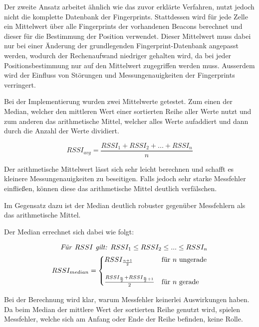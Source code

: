 Der zweite Ansatz arbeitet ähnlich wie das zuvor erklärte Verfahren, nutzt jedoch nicht die komplette Datenbank der Fingerprints. 
Stattdessen wird für jede Zelle ein Mittelwert über alle Fingerprints der vorhandenen Beacons berechnet und dieser für die Bestimmung der Position verwendet.
Dieser Mittelwert muss dabei nur bei einer Änderung der grundlegenden Fingerprint-Datenbank angepasst werden, wodurch der Rechenaufwand niedriger gehalten wird, da bei jeder Positionsbestimmung nur auf den Mittelwert zugegriffen werden muss.
Ausserdem wird der Einfluss von Störungen und Messungenauigkeiten der Fingerprints verringert.

Bei der Implementierung wurden zwei Mittelwerte getestet. Zum einen der Median, welcher den mittleren Wert einer sortierten Reihe aller Werte nutzt und zum anderen das arithmetische Mittel, welcher alles Werte aufaddiert und dann durch die Anzahl der Werte dividiert.

\begin{equation}
	RSSI_{avg} = \frac{RSSI_{1} + RSSI_{2} + ... + RSSI_{n}}{n}
\end{equation}

Der arithmetische Mittelwert lässt sich sehr leicht berechnen und schafft es kleinere Messungenauigkeiten zu beseitigen. Falls jedoch sehr starke Messfehler einfließen, können diese das arithmetische Mittel deutlich verfälschen.

Im Gegensatz dazu ist der Median deutlich robuster gegenüber Messfehlern als das arithmetische Mittel.

Der Median errechnet sich dabei wie folgt: 

\begin{equation}
	\begin{split}
	\text{\emph{Für }}RSSI \text{\emph{ gilt: }} RSSI_{1} \leq RSSI_{2} \leq ... \leq RSSI_{n} \\
	RSSI_{median}=\begin{cases}
	RSSI_{\frac{n+1}{2}} & \text{für } n \text{ ungerade}\\ \\
	\frac{RSSI_{\frac{n}{2}} + RSSI_{\frac{n}{2}+1}}{2} & \text{für } n \text{ gerade} \\
	\end{cases}
	\end{split}
\end{equation}

Bei der Berechnung wird klar, warum Messfehler keinerlei Auswirkungen haben. Da beim Median der mittlere Wert der sortierten Reihe genutzt wird, spielen Messfehler, welche sich am Anfang oder Ende der Reihe befinden, keine Rolle.

